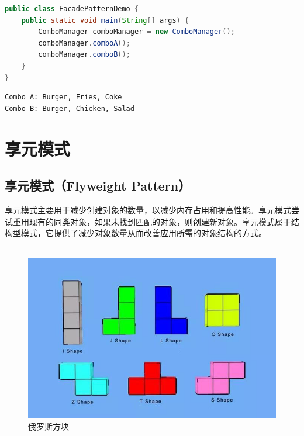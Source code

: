 \begin{lstlisting}[language=Java, title=FacadePatternDemo.java]
public class FacadePatternDemo {
    public static void main(String[] args) {
        ComboManager comboManager = new ComboManager();
        comboManager.comboA();
        comboManager.comboB();
    }
}
\end{lstlisting}

\begin{tcolorbox}
    \begin{verbatim}
Combo A: Burger, Fries, Coke
Combo B: Burger, Chicken, Salad
\end{verbatim}
\end{tcolorbox}

\newpage

\section{享元模式}

\subsection{享元模式（Flyweight Pattern）}

享元模式主要用于减少创建对象的数量，以减少内存占用和提高性能。享元模式尝试重用现有的同类对象，如果未找到匹配的对象，则创建新对象。享元模式属于结构型模式，它提供了减少对象数量从而改善应用所需的对象结构的方式。\\

\\

\begin{figure}[H]
    \centering
    \includegraphics[scale=0.6]{img/C4/4-13/1.png}
    \caption{俄罗斯方块}
\end{figure}

